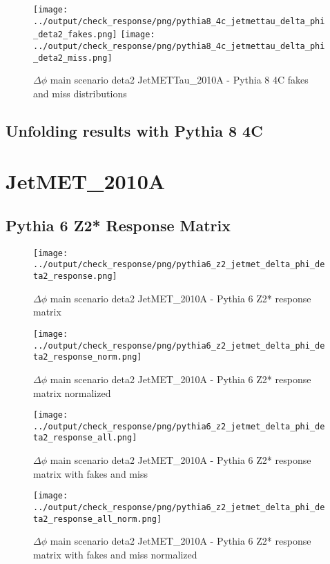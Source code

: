 \documentclass[11pt]{book}
\begin{document}
\begin{figure}[ht]
\centering
\texttt{[image: ../output/check\_response/png/pythia8\_4c\_jetmettau\_delta\_phi\_deta2\_fakes.png]}
\texttt{[image: ../output/check\_response/png/pythia8\_4c\_jetmettau\_delta\_phi\_deta2\_miss.png]}
\caption{$\Delta\phi$ main scenario deta2 JetMETTau\_2010A - Pythia 8 4C fakes and miss distributions}
\label{p8_jetmettau_delta_phi_deta2_fakesmiss}
\end{figure}


\clearpage
\subsection{Unfolding results with Pythia 8 4C}


\section{JetMET\_2010A}
\subsection{Pythia 6 Z2* Response Matrix}

\begin{figure}[ht]
\centering
\texttt{[image: ../output/check\_response/png/pythia6\_z2\_jetmet\_delta\_phi\_deta2\_response.png]}
\caption{$\Delta\phi$ main scenario deta2 JetMET\_2010A - Pythia 6 Z2* response matrix}
\label{p6_jetmet_delta_phi_deta2_response}
\end{figure}

\begin{figure}[ht]
\centering
\texttt{[image: ../output/check\_response/png/pythia6\_z2\_jetmet\_delta\_phi\_deta2\_response\_norm.png]}
\caption{$\Delta\phi$ main scenario deta2 JetMET\_2010A - Pythia 6 Z2* response matrix normalized}
\label{p6_jetmet_delta_phi_deta2_response_norm}
\end{figure}

\begin{figure}[ht]
\centering
\texttt{[image: ../output/check\_response/png/pythia6\_z2\_jetmet\_delta\_phi\_deta2\_response\_all.png]}
\caption{$\Delta\phi$ main scenario deta2 JetMET\_2010A - Pythia 6 Z2* response matrix with fakes and miss}
\label{p6_jetmet_delta_phi_deta2_response_all}
\end{figure}

\begin{figure}[ht]
\centering
\texttt{[image: ../output/check\_response/png/pythia6\_z2\_jetmet\_delta\_phi\_deta2\_response\_all\_norm.png]}
\caption{$\Delta\phi$ main scenario deta2 JetMET\_2010A - Pythia 6 Z2* response matrix with fakes and miss normalized}
\label{p6_jetmet_delta_phi_deta2_response_all_norm}
\end{figure}
\end{document}
